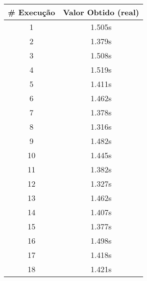\documentclass[11pt]{article}
\begin{document}
\begin{table}[!h]
\begin{center}
\begin{minipage}{0.48\textwidth}
\begin{tabular}{| c | c |}
			\hline
				\textbf{\# Execução} &  \textbf{Valor Obtido (real)} \\ \hline
				1 & 1.505s \\ \hline
				2 & 1.379s \\ \hline
				3 & 1.508s \\ \hline
				4 & 1.519s \\ \hline
				5 & 1.411s \\ \hline
				6 & 1.462s \\ \hline
				7 & 1.378s \\ \hline
				8 & 1.316s \\ \hline
				9 & 1.482s \\ \hline
				10 & 1.445s \\ \hline
				11 & 1.382s \\ \hline
				12 & 1.327s \\ \hline
				13 & 1.462s \\ \hline
				14 & 1.407s \\ \hline
				15 & 1.377s \\ \hline
				16 & 1.498s \\ \hline
				17 & 1.418s \\ \hline
				18 & 1.421s \\ \hline
			\end{tabular}
		\end{minipage}
	\end{center}
\end{table}
\end{document}
